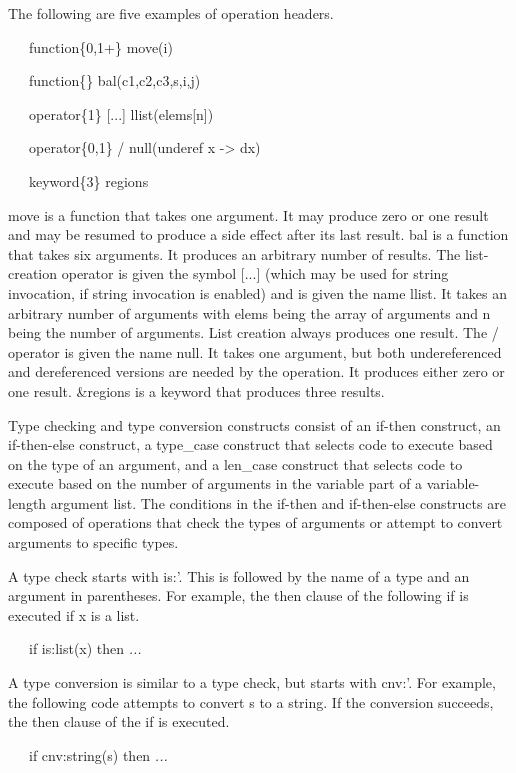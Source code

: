 The following are five examples of operation headers. 

{\ttfamily\mdseries
\ \ \ function\{0,1+\} move(i)}

{\ttfamily\mdseries
\ \ \ function\{\} bal(c1,c2,c3,s,i,j)}

{\ttfamily\mdseries
\ \ \ operator\{1\} [...] llist(elems[n])}

{\ttfamily\mdseries
\ \ \ operator\{0,1\} / null(underef x -{\textgreater} dx)}

{\ttfamily\mdseries
\ \ \ keyword\{3\} regions}

\noindent move is a function that takes one argument. It may produce
zero or one result and may be resumed to produce a side effect after
its last result. bal is a function that takes six arguments. It
produces an arbitrary number of results.  The list-creation operator
is given the symbol [...] (which may be used for string invocation, if
string invocation is enabled) and is given the name llist. It takes an
arbitrary number of arguments with elems being the array of arguments
and n being the number of arguments. List creation always produces one
result. The / operator is given the name null.  It takes one argument,
but both undereferenced and dereferenced versions are needed by the
operation. It produces either zero or one result. \&regions is a
keyword that produces three results.

Type checking and type conversion constructs consist of an if-then
construct, an if-then-else construct, a type\_case construct that
selects code to execute based on the type of an argument, and a
len\_case construct that selects code to execute based on the number
of arguments in the variable part of a variable-length argument
list. The conditions in the if-then and if-then-else constructs are
composed of operations that check the types of arguments or attempt to
convert arguments to specific types.

A type check starts with {\textasciigrave}is:'. This is followed by
the name of a type and an argument in parentheses.  For example, the
then clause of the following if is executed if x is a list.

{\ttfamily\mdseries
\ \ \ if is:list(x) then \textit{...}}


A type conversion is similar to a type check, but starts with
{\textasciigrave}cnv:'. For example, the following code attempts to
convert s to a string. If the conversion succeeds, the then clause of
the if is executed.

{\ttfamily\mdseries
\ \ \ if cnv:string(s) then \textit{...}}


